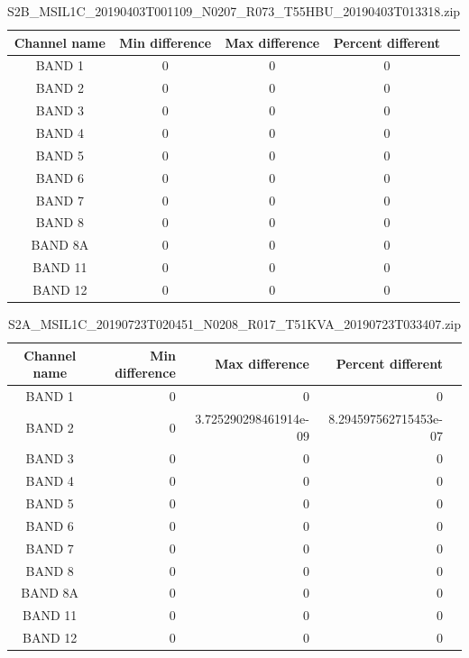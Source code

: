 \documentclass[a4paper]{article}
\begin{document}
    \begin{table}[ht!]
      \caption{\footnotesize{S2B\_MSIL1C\_20190403T001109\_N0207\_R073\_T55HBU\_20190403T013318.zip}}\label{table:18}
      \centering
      \small
      \begin{tabular}{ccccc} \midrule
        \textbf{Channel name} & \textbf{Min difference} & \textbf{Max difference} & \textbf{Percent different} \\ \midrule
        BAND 1 & 0 & 0 & 0 \\
        BAND 2 & 0 & 0 & 0 \\
        BAND 3 & 0 & 0 & 0 \\
        BAND 4 & 0 & 0 & 0 \\
        BAND 5 & 0 & 0 & 0 \\
        BAND 6 & 0 & 0 & 0 \\
        BAND 7 & 0 & 0 & 0 \\
        BAND 8 & 0 & 0 & 0 \\
        BAND 8A & 0 & 0 & 0 \\
        BAND 11 & 0 & 0 & 0 \\
        BAND 12 & 0 & 0 & 0 \\ \midrule
      \end{tabular}
    \end{table}

    \begin{table}[ht!]
      \caption{\footnotesize{S2A\_MSIL1C\_20190723T020451\_N0208\_R017\_T51KVA\_20190723T033407.zip}}\label{table:19}
      \centering
      \small
      \begin{tabular}{cn{2}{4}n{2}{4}n{2}{4}n{2}{4}} \midrule
        \textbf{Channel name} & \textbf{Min difference} & \textbf{Max difference} & \textbf{Percent different} \\ \midrule
        BAND 1 & 0 & 0 & 0 \\
        BAND 2 & 0 & 3.725290298461914e-09 & 8.294597562715453e-07 \\
        BAND 3 & 0 & 0 & 0 \\
        BAND 4 & 0 & 0 & 0 \\
        BAND 5 & 0 & 0 & 0 \\
        BAND 6 & 0 & 0 & 0 \\
        BAND 7 & 0 & 0 & 0 \\
        BAND 8 & 0 & 0 & 0 \\
        BAND 8A & 0 & 0 & 0 \\
        BAND 11 & 0 & 0 & 0 \\
        BAND 12 & 0 & 0 & 0 \\ \midrule
      \end{tabular}
    \end{table}
\end{document}
